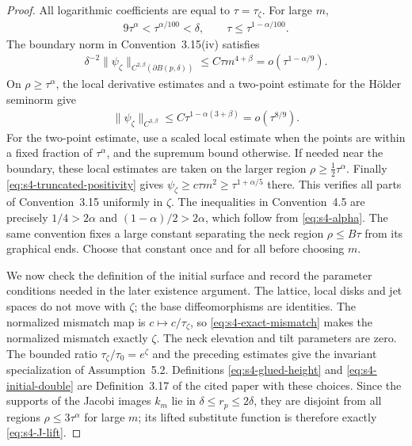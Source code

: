 \documentclass[a4paper,11pt,oneside,reqno]{amsart}
\numberwithin{equation}{section}
\theoremstyle{definition}
\begin{document}
\begin{proof}
    All logarithmic coefficients are equal to
    $\tau=\tau_\zeta$. For large $m$,
    \begin{align*}
        9\tau^\alpha<\tau^{\alpha/100}<\delta,
        \qquad \tau\leq\tau^{1-\alpha/100}.
    \end{align*}
    The boundary norm in Convention~3.15(iv) satisfies
    \begin{align*}
        \delta^{-2}\|\psi_\zeta\|_{C^{2,\beta}(\partial B(p,\delta))}
        \leq C\tau m^{4+\beta}
        =o(\tau^{1-\alpha/9}).
    \end{align*}
    On $\rho\geq\tau^\alpha$, the local derivative estimates
    and a two-point estimate for the H\"older seminorm give
    \begin{align*}
        \|\psi_\zeta\|_{C^{3,\beta}}
        \leq C\tau^{1-\alpha(3+\beta)}
        =o(\tau^{8/9}).
    \end{align*}
    For the two-point estimate, use a scaled local estimate when
    the points are within a fixed fraction of $\tau^\alpha$,
    and the supremum bound otherwise. If needed near the boundary,
    these local estimates are taken on the larger region
    $\rho\geq\tfrac12\tau^\alpha$.
    Finally \eqref{eq:s4-truncated-positivity} gives
    $\psi_\zeta\geq c\tau m^2\geq\tau^{1+\alpha/5}$ there.
    This verifies all parts of Convention~3.15 uniformly in
    $\zeta$. The inequalities in Convention~4.5 are precisely
    $1/4>2\alpha$ and $(1-\alpha)/2>2\alpha$, which follow
    from \eqref{eq:s4-alpha}. The same convention fixes a
    large constant separating the neck region
    $\rho\leq B\tau$ from its graphical ends. Choose that
    constant once and for all before choosing $m$.

    We now check the definition of the initial surface and
    record the parameter conditions needed in the later
    existence argument.
    The lattice, local disks and jet spaces do not move with
    $\zeta$; the base diffeomorphisms are identities. The
    normalized mismatch map is $c\mapsto c/\tau_\zeta$, so
    \eqref{eq:s4-exact-mismatch} makes the normalized mismatch
    exactly $\zeta$. The neck elevation and tilt parameters are
    zero. The bounded ratio $\tau_\zeta/\tau_0=e^\zeta$ and the
    preceding estimates give the invariant specialization of
    Assumption~5.2. Definitions \eqref{eq:s4-glued-height} and
    \eqref{eq:s4-initial-double} are Definition~3.17 of the cited
    paper with these choices. Since the supports of the Jacobi
    images $k_m$ lie
    in $\delta\leq r_p\leq2\delta$, they are disjoint from all
    regions $\rho\leq3\tau^\alpha$ for large $m$; its lifted
    substitute function is therefore exactly
    \eqref{eq:s4-J-lift}.


\end{proof}
\end{document}

